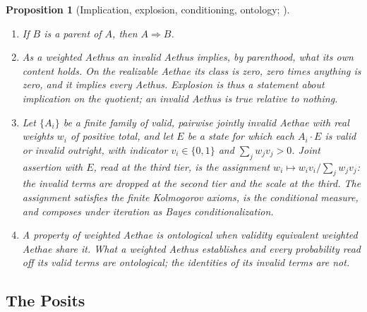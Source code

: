 \documentclass[11pt]{article}
\newtheorem{proposition}{Proposition}
\theoremstyle{definition}
\newcommand{\Aethus}{Aethus}
\begin{document}
\begin{proposition}[Implication, explosion, conditioning, ontology; \cite{Aethus}]\label{prop:core_implication}
\begin{enumerate}
\item[(i)] If $B$ is a parent of $A$, then $A \Rightarrow B$.
\item[(ii)] As a weighted \Aethus{} an invalid \Aethus{} implies, by parenthood, what its own content holds. On the realizable Aethae its class is zero, zero times anything is zero, and it implies every \Aethus{}. Explosion is thus a statement about implication on the quotient; an invalid \Aethus{} is true relative to nothing.
\item[(iii)] Let $\{A_i\}$ be a finite family of valid, pairwise jointly invalid Aethae with real weights $w_i$ of positive total, and let $E$ be a state for which each $A_i \cdot E$ is valid or invalid outright, with indicator $v_i \in \{0, 1\}$ and $\sum_j w_j v_j > 0$. Joint assertion with $E$, read at the third tier, is the assignment $w_i \mapsto w_i v_i / \sum_j w_j v_j$: the invalid terms are dropped at the second tier and the scale at the third. The assignment satisfies the finite Kolmogorov axioms, is the conditional measure, and composes under iteration as Bayes conditionalization.
\item[(iv)] A property of weighted Aethae is \emph{ontological} when validity equivalent weighted Aethae share it. What a weighted \Aethus{} establishes and every probability read off its valid terms are ontological; the identities of its invalid terms are not.
\end{enumerate}
\end{proposition}

\subsection{The Posits}\label{sec:core_posits}
\end{document}
